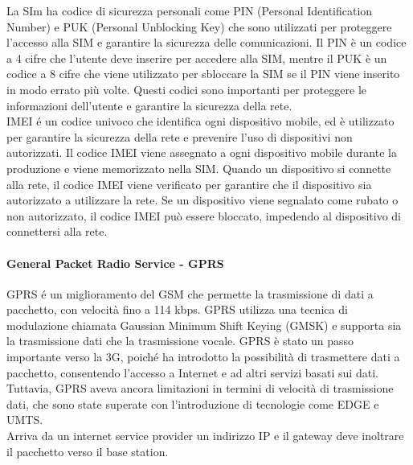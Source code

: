 La SIm ha codice di sicurezza personali come PIN (Personal Identification Number) e PUK (Personal Unblocking Key) che sono utilizzati per proteggere l'accesso alla SIM e garantire la sicurezza delle comunicazioni. Il PIN è un codice a 4 cifre che l'utente deve inserire per accedere alla SIM, mentre il PUK è un codice a 8 cifre che viene utilizzato per sbloccare la SIM se il PIN viene inserito in modo errato più volte. Questi codici sono importanti per proteggere le informazioni dell'utente e garantire la sicurezza della rete.\\
IMEI é un codice univoco che identifica ogni dispositivo mobile, ed è utilizzato per garantire la sicurezza della rete e prevenire l'uso di dispositivi non autorizzati. Il codice IMEI viene assegnato a ogni dispositivo mobile durante la produzione e viene memorizzato nella SIM. Quando un dispositivo si connette alla rete, il codice IMEI viene verificato per garantire che il dispositivo sia autorizzato a utilizzare la rete. Se un dispositivo viene segnalato come rubato o non autorizzato, il codice IMEI può essere bloccato, impedendo al dispositivo di connettersi alla rete.\\

\paragraph{General Packet Radio Service - GPRS}
GPRS é un miglioramento del GSM che permette la trasmissione di dati a pacchetto, con velocità fino a 114 kbps. GPRS utilizza una tecnica di modulazione chiamata Gaussian Minimum Shift Keying (GMSK) e supporta sia la trasmissione dati che la trasmissione vocale. GPRS è stato un passo importante verso la 3G, poiché ha introdotto la possibilità di trasmettere dati a pacchetto, consentendo l'accesso a Internet e ad altri servizi basati sui dati. Tuttavia, GPRS aveva ancora limitazioni in termini di velocità di trasmissione dati, che sono state superate con l'introduzione di tecnologie come EDGE e UMTS.\\
Arriva da un internet service provider un indirizzo IP e il gateway deve inoltrare il pacchetto verso il base station. 

